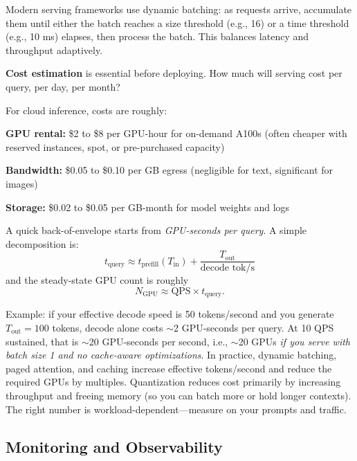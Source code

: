 Modern serving frameworks use dynamic batching: as requests arrive, accumulate them until either the batch reaches a size threshold (e.g., 16) or a time threshold (e.g., 10 ms) elapses, then process the batch. This balances latency and throughput adaptively.

\textbf{Cost estimation} is essential before deploying. How much will serving cost per query, per day, per month?

For cloud inference, costs are roughly:

\vspace{0.5em}

\textbf{GPU rental:} \$2 to \$8 per GPU-hour for on-demand A100s (often cheaper with reserved instances, spot, or pre-purchased capacity)

\textbf{Bandwidth:} \$0.05 to \$0.10 per GB egress (negligible for text, significant for images)

\textbf{Storage:} \$0.02 to \$0.05 per GB-month for model weights and logs

\vspace{0.5em}

A quick back-of-envelope starts from \emph{GPU-seconds per query}. A simple decomposition is:
\begin{equation}
t_{\text{query}} \approx t_{\text{prefill}}(T_{\text{in}}) + \frac{T_{\text{out}}}{\text{decode tok/s}}
\end{equation}
and the steady-state GPU count is roughly
\begin{equation}
N_{\text{GPU}} \approx \text{QPS} \times t_{\text{query}}.
\end{equation}

Example: if your effective decode speed is 50 tokens/second and you generate $T_{\text{out}} = 100$ tokens, decode alone costs $\sim$2 GPU-seconds per query. At 10 QPS sustained, that is $\sim$20 GPU-seconds per second, i.e., $\sim$20 GPUs \emph{if you serve with batch size 1 and no cache-aware optimizations}. In practice, dynamic batching, paged attention, and caching increase effective tokens/second and reduce the required GPUs by multiples. Quantization reduces cost primarily by increasing throughput and freeing memory (so you can batch more or hold longer contexts). The right number is workload-dependent---measure on your prompts and traffic.

\vspace{1em}


\subsection{Monitoring and Observability}

